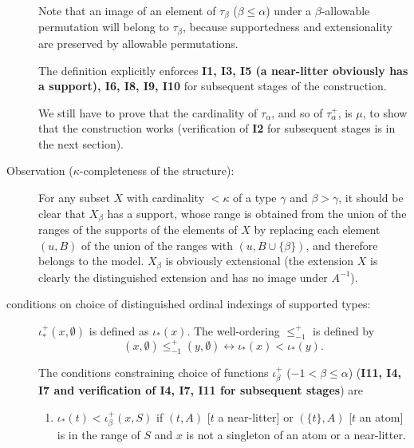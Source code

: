 \documentclass[112pt]{article}
\begin{document}
\begin{description}
Note that an image of an element of $\tau_\beta$ ($\beta\leq \alpha$)  under a $\beta$-allowable permutation will belong to $\tau_\beta$, because supportedness and extensionality are preserved by allowable permutations.

The definition explicitly enforces {\bf I1, I3, I5 (a near-litter obviously has a support), I6, I8, I9, I10} for subsequent stages of the construction.

We still have to prove that the cardinality of $\tau_\alpha$, and so of $\tau^+_\alpha$, is $\mu$, to show that the construction works (verification of {\bf I2} for subsequent stages is in the next section).

\item[Observation ($\kappa$-completeness of the structure):]  For any subset $X$ with cardinality $<\kappa$ of a type $\gamma$ and $\beta>\gamma$, it should be clear that $X_\beta$ has a support, whose range is obtained from the union of the ranges of the supports of the elements of $X$  by replacing each element $(u,B)$ of the union of the ranges  with $(u,B \cup \{\beta\})$, and therefore belongs to the model.  $X_\beta$ is obviously extensional (the extension $X$ is clearly the distinguished extension and has no image under $A^{-1}$).

\item[conditions on choice of distinguished ordinal indexings of supported types:]  

$\iota_*^+(x,\emptyset)$ is defined as $\iota_*(x)$.
The well-ordering $\leq_{-1}^+$ is defined by $$(x,\emptyset) \leq_{-1}^+ (y,\emptyset) \leftrightarrow \iota_*(x) < \iota_*(y).$$

\begin{comment}

The well-ordering $\leq_\alpha^+$ of $\tau_\alpha^+$ ($\alpha \in \lambda$) must satisfy the condition that for each $(x,S) \in \tau_\alpha^+$, for each $(z,A) \in {\tt rng}(S)$ and litter $L = f_{\beta,\gamma}(y,T)$ with $\beta<\alpha$,  where $L$  meets $z$, $\iota_*^+(y,T) < \iota_*^+(x,S)$ must hold.

\end{comment}

The conditions constraining choice of functions $\iota^+_\beta$ ($-1 < \beta \leq \alpha$) ({\bf I11, I4, I7 and verification of {\bf I4, I7, I11} for subsequent stages}) are

\begin{enumerate}

\item $\iota_*(t) < \iota^+_\beta(x,S)$ if $(t,A)$ [$t$ a near-litter] or $(\{t\},A)$ [$t$ an atom] is in the range of $S$ and $x$ is not a singleton of an atom or a near-litter.


\end{enumerate}
\end{description}
\end{document}
